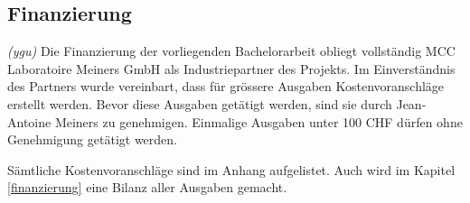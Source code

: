 \subsection{Finanzierung}
\textit{(ygu)} Die Finanzierung der vorliegenden Bachelorarbeit obliegt vollständig MCC Laboratoire Meiners GmbH als Industriepartner des Projekts. Im Einverständnis des Partners wurde vereinbart, dass für grössere Ausgaben Kostenvoranschläge erstellt werden. Bevor diese Ausgaben getätigt werden, sind sie durch Jean-Antoine Meiners zu genehmigen. Einmalige Ausgaben unter 100 CHF dürfen ohne Genehmigung getätigt werden.

Sämtliche Kostenvoranschläge sind im Anhang aufgelistet. Auch wird im Kapitel \ref{finanzierung} eine Bilanz aller Ausgaben gemacht. 